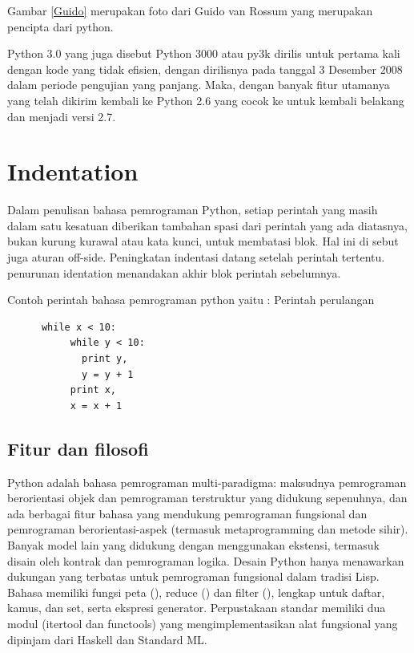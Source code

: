       Gambar \ref{Guido} merupakan foto dari Guido van Rossum yang merupakan pencipta dari python.
      
      Python 3.0 yang juga disebut Python 3000 atau py3k dirilis untuk pertama kali dengan kode yang tidak efisien, dengan dirilisnya pada tanggal 
      3 Desember 2008 dalam periode pengujian yang panjang. Maka, dengan banyak fitur utamanya yang telah dikirim kembali ke Python 2.6 yang cocok ke untuk kembali belakang dan menjadi versi 2.7. 
      
\section {Indentation}
      Dalam penulisan bahasa pemrograman Python, setiap perintah yang masih dalam satu kesatuan diberikan tambahan spasi dari 
      perintah yang ada diatasnya, bukan kurung kurawal atau kata kunci, untuk membatasi blok. Hal ini di sebut juga aturan off-side. 
      Peningkatan indentasi datang setelah perintah tertentu. penurunan identation menandakan akhir blok perintah sebelumnya.

      Contoh perintah bahasa pemrograman python yaitu :
      Perintah perulangan
	  
	  \begin{verbatim}
      while x < 10: 
      	   while y < 10: 
		     print y, 
		     y = y + 1 
	       print x,
	       x = x + 1
	\end{verbatim}

      
\subsection {Fitur dan filosofi}
	Python adalah bahasa pemrograman multi-paradigma: maksudnya pemrograman berorientasi objek dan pemrograman terstruktur 
	yang didukung sepenuhnya, dan ada berbagai fitur bahasa yang mendukung pemrograman fungsional dan pemrograman berorientasi-aspek
	(termasuk metaprogramming dan metode sihir). Banyak model lain yang didukung dengan menggunakan ekstensi, termasuk disain 
	oleh kontrak dan pemrograman logika. 
	Desain Python hanya menawarkan dukungan yang terbatas untuk pemrograman fungsional dalam tradisi Lisp. 
	Bahasa memiliki fungsi peta (), reduce () dan filter (), lengkap untuk daftar, kamus, dan set, serta ekspresi generator. 
	Perpustakaan standar memiliki dua modul (itertool dan functools) yang mengimplementasikan alat fungsional yang dipinjam 
	dari Haskell dan Standard ML\cite {van2007python}.

